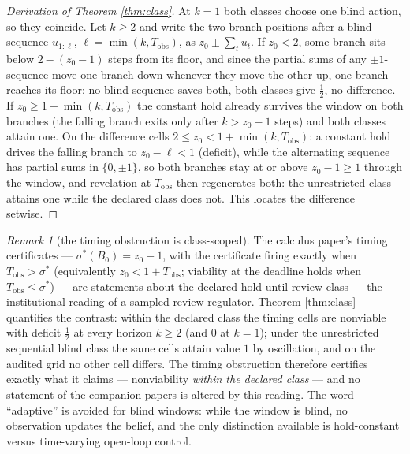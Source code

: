 \documentclass[10pt,twocolumn]{article}
\theoremstyle{plain}
\theoremstyle{definition}
\theoremstyle{remark}
\newtheorem{remark}[theorem]{Remark}
\begin{document}
\begin{proof}[Derivation of Theorem \ref{thm:class}]
At \(k = 1\) both classes choose one blind action, so they coincide. Let
\(k \ge 2\) and write the two branch positions after a blind sequence
\(u_{1:\ell}\), \(\ell = \min(k, T_{\mathrm{obs}})\), as
\(z_{0} \pm \sum_{t} u_{t}\). If \(z_{0} < 2\), some branch sits below
\(2 - (z_{0} - 1)\) steps from its floor, and since the partial sums of
any \(\pm1\)-sequence move one branch down whenever they move the other
up, one branch reaches its floor: no blind sequence saves both, both
classes give \(\tfrac{1}{2}\), no difference. If
\(z_{0} \ge 1 + \min(k, T_{\mathrm{obs}})\) the constant hold already
survives the window on both branches (the falling branch exits only
after \(k > z_{0} - 1\) steps) and both classes attain one. On the
difference cells \(2 \le z_{0} < 1 + \min(k, T_{\mathrm{obs}})\): a
constant hold drives the
falling branch to \(z_{0} - \ell < 1\) (deficit), while the alternating
sequence has partial sums in \(\{0, \pm 1\}\), so both branches stay at
or above \(z_{0} - 1 \ge 1\) through the window, and revelation at
\(T_{\mathrm{obs}}\) then regenerates both: the unrestricted class
attains one while the declared class does not. This locates the
difference setwise.
\end{proof}

\begin{remark}[the timing obstruction is class-scoped]\label{rem:scope}
The calculus paper's timing certificates --- \(\sigma^{*}(B_{0}) =
z_{0} - 1\), with the certificate firing exactly when
\(T_{\mathrm{obs}} > \sigma^{*}\) (equivalently
\(z_{0} < 1 + T_{\mathrm{obs}}\); viability at the deadline holds when
\(T_{\mathrm{obs}} \le \sigma^{*}\)) --- are statements about the
declared hold-until-review class --- the institutional reading of a
sampled-review regulator. Theorem \ref{thm:class} quantifies the
contrast: within the declared class the timing cells are nonviable with
deficit \(\tfrac{1}{2}\) at every horizon \(k \ge 2\) (and \(0\) at
\(k = 1\)); under the unrestricted sequential blind class the same
cells attain value \(1\) by oscillation, and on the audited grid no
other cell differs. The
timing obstruction therefore certifies exactly what it claims ---
nonviability \emph{within the declared class} --- and no statement of the
companion papers is altered by this reading. The word ``adaptive'' is
avoided for blind windows: while the window is blind, no observation
updates the belief, and the only distinction available is hold-constant
versus time-varying open-loop control.
\end{remark}
\end{document}
